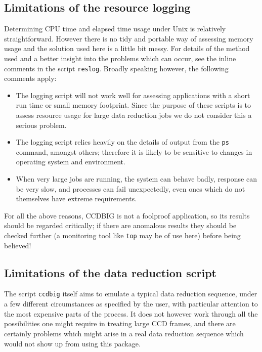 \subsection{Limitations of the resource logging}

Determining CPU time and elapsed time usage under Unix 
is relatively straightforward. 
However there is no tidy and portable way of
assessing memory usage and the solution used here is
a little bit messy.
For details of the method used and a better insight into
the problems which can occur, see the inline comments in 
the script {\tt reslog}.
Broadly speaking however, the following comments apply:
\begin{itemize}
%
\item
The logging script will not work well for assessing applications
with a short run time or small memory footprint.  
Since the purpose of these scripts is to assess resource usage
for large data reduction jobs we do not consider this a serious problem.
%
\item
The logging script relies heavily on the details of output from 
the {\tt ps} command, amongst others; therefore it is 
likely to be sensitive to changes in operating system and environment.
%
\item
When very large jobs are running, 
the system can behave badly,
response can be very slow,
and processes can fail unexpectedly, even ones which 
do not themselves have extreme requirements.
\end{itemize}
For all the above reasons, CCDBIG is not a foolproof application,
so its results should be regarded critically; 
if there are anomalous results they should be checked further 
(a monitoring tool like {\tt top} may be of use here)
before being believed!


\subsection{Limitations of the data reduction script}

The script {\tt ccdbig} itself aims to 
emulate a typical data reduction sequence,
under a few different circumstances 
as specified by the user,
with particular attention to the most expensive parts of the process.
It does not however work through all the possibilities 
one might require in treating large CCD frames,
and there are certainly problems which might arise
in a real data reduction sequence which would not show
up from using this package.

